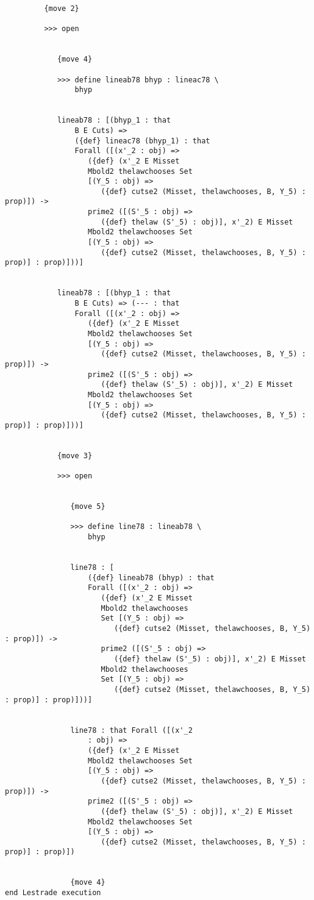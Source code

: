 \documentclass[12pt]{article}
\begin{document}
\begin{verbatim}
         {move 2}

         >>> open


            {move 4}

            >>> define lineab78 bhyp : lineac78 \
                bhyp


            lineab78 : [(bhyp_1 : that 
                B E Cuts) => 
                ({def} lineac78 (bhyp_1) : that 
                Forall ([(x'_2 : obj) => 
                   ({def} (x'_2 E Misset 
                   Mbold2 thelawchooses Set 
                   [(Y_5 : obj) => 
                      ({def} cutse2 (Misset, thelawchooses, B, Y_5) : prop)]) -> 
                   prime2 ([(S'_5 : obj) => 
                      ({def} thelaw (S'_5) : obj)], x'_2) E Misset 
                   Mbold2 thelawchooses Set 
                   [(Y_5 : obj) => 
                      ({def} cutse2 (Misset, thelawchooses, B, Y_5) : prop)] : prop)]))]


            lineab78 : [(bhyp_1 : that 
                B E Cuts) => (--- : that 
                Forall ([(x'_2 : obj) => 
                   ({def} (x'_2 E Misset 
                   Mbold2 thelawchooses Set 
                   [(Y_5 : obj) => 
                      ({def} cutse2 (Misset, thelawchooses, B, Y_5) : prop)]) -> 
                   prime2 ([(S'_5 : obj) => 
                      ({def} thelaw (S'_5) : obj)], x'_2) E Misset 
                   Mbold2 thelawchooses Set 
                   [(Y_5 : obj) => 
                      ({def} cutse2 (Misset, thelawchooses, B, Y_5) : prop)] : prop)]))]


            {move 3}

            >>> open


               {move 5}

               >>> define line78 : lineab78 \
                   bhyp


               line78 : [
                   ({def} lineab78 (bhyp) : that 
                   Forall ([(x'_2 : obj) => 
                      ({def} (x'_2 E Misset 
                      Mbold2 thelawchooses 
                      Set [(Y_5 : obj) => 
                         ({def} cutse2 (Misset, thelawchooses, B, Y_5) : prop)]) -> 
                      prime2 ([(S'_5 : obj) => 
                         ({def} thelaw (S'_5) : obj)], x'_2) E Misset 
                      Mbold2 thelawchooses 
                      Set [(Y_5 : obj) => 
                         ({def} cutse2 (Misset, thelawchooses, B, Y_5) : prop)] : prop)]))]


               line78 : that Forall ([(x'_2 
                   : obj) => 
                   ({def} (x'_2 E Misset 
                   Mbold2 thelawchooses Set 
                   [(Y_5 : obj) => 
                      ({def} cutse2 (Misset, thelawchooses, B, Y_5) : prop)]) -> 
                   prime2 ([(S'_5 : obj) => 
                      ({def} thelaw (S'_5) : obj)], x'_2) E Misset 
                   Mbold2 thelawchooses Set 
                   [(Y_5 : obj) => 
                      ({def} cutse2 (Misset, thelawchooses, B, Y_5) : prop)] : prop)])


               {move 4}
end Lestrade execution
\end{verbatim}
\end{document}
